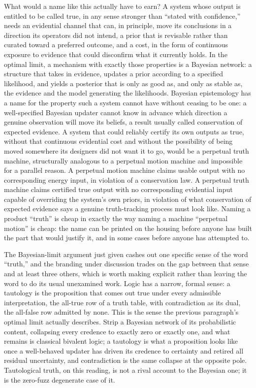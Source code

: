 \documentclass[11pt]{article}
\begin{document}
What would a name like this actually have to earn? A system whose output is entitled to be called true, in any sense stronger than ``stated with confidence,'' needs an evidential channel that can, in principle, move its conclusions in a direction its operators did not intend, a prior that is revisable rather than curated toward a preferred outcome, and a cost, in the form of continuous exposure to evidence that could disconfirm what it currently holds. In the optimal limit, a mechanism with exactly those properties is a Bayesian network: a structure that takes in evidence, updates a prior according to a specified likelihood, and yields a posterior that is only as good as, and only as stable as, the evidence and the model generating the likelihoods. Bayesian epistemology has a name for the property such a system cannot have without ceasing to be one: a well-specified Bayesian updater cannot know in advance which direction a genuine observation will move its beliefs, a result usually called conservation of expected evidence. A system that could reliably certify its own outputs as true, without that continuous evidential cost and without the possibility of being moved somewhere its designers did not want it to go, would be a perpetual truth machine, structurally analogous to a perpetual motion machine and impossible for a parallel reason. A perpetual motion machine claims usable output with no corresponding energy input, in violation of a conservation law. A perpetual truth machine claims certified true output with no corresponding evidential input capable of overriding the system's own priors, in violation of what conservation of expected evidence says a genuine truth-tracking process must look like. Naming a product ``truth'' is cheap in exactly the way naming a machine ``perpetual motion'' is cheap: the name can be printed on the housing before anyone has built the part that would justify it, and in some cases before anyone has attempted to.

The Bayesian-limit argument just given cashes out one specific sense of the word ``truth,'' and the branding under discussion trades on the gap between that sense and at least three others, which is worth making explicit rather than leaving the word to do its usual unexamined work. Logic has a narrow, formal sense: a tautology is the proposition that comes out true under every admissible interpretation, the all-true row of a truth table, with contradiction as its dual, the all-false row admitted by none. This is the sense the previous paragraph's optimal limit actually describes. Strip a Bayesian network of its probabilistic content, collapsing every credence to exactly zero or exactly one, and what remains is classical bivalent logic; a tautology is what a proposition looks like once a well-behaved updater has driven its credence to certainty and retired all residual uncertainty, and contradiction is the same collapse at the opposite pole. Tautological truth, on this reading, is not a rival account to the Bayesian one; it is the zero-fuzz degenerate case of it.
\end{document}

